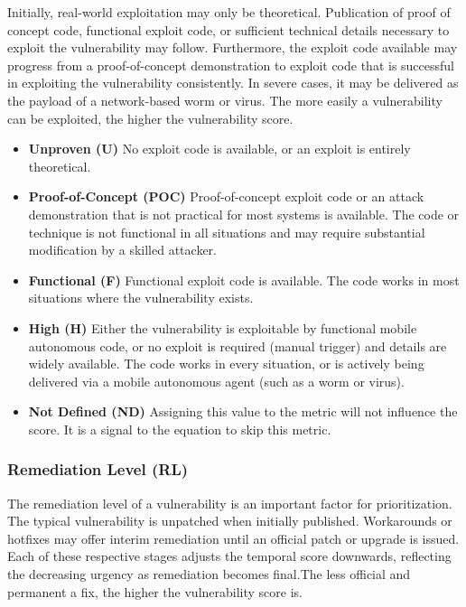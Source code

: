     Initially, real-world exploitation may only be theoretical. Publication
    of proof of concept code, functional exploit code, or sufficient
    technical details necessary to exploit the vulnerability may follow.
    Furthermore, the exploit code available may progress from a
    proof-of-concept demonstration to exploit code that is successful in
    exploiting the vulnerability consistently. In severe cases, it may be
    delivered as the payload of a network-based worm or virus. The more
    easily a vulnerability can be exploited, the higher the vulnerability
    score.

    \begin{itemize}
      \item
        \textbf{Unproven (U)} No exploit code is available, or an exploit is
        entirely theoretical.
      \item
        \textbf{Proof-of-Concept (POC)} Proof-of-concept exploit code or an
        attack demonstration that is not practical for most systems is
        available. The code or technique is not functional in all situations
        and may require substantial modification by a skilled attacker.
      \item
        \textbf{Functional (F)} Functional exploit code is available. The code
        works in most situations where the vulnerability exists.
      \item
        \textbf{High (H)} Either the vulnerability is exploitable by
        functional mobile autonomous code, or no exploit is required (manual
        trigger) and details are widely available. The code works in every
        situation, or is actively being delivered via a mobile autonomous
        agent (such as a worm or virus).
      \item
        \textbf{Not Defined (ND)} Assigning this value to the metric will not
        influence the score. It is a signal to the equation to skip this
        metric.
    \end{itemize}

    \subsubsection{Remediation Level (RL)}\label{subsec:remediation-level-rl}

    The remediation level of a vulnerability is an important factor for
    prioritization. The typical vulnerability is unpatched when initially
    published. Workarounds or hotfixes may offer interim remediation until
    an official patch or upgrade is issued. Each of these respective stages
    adjusts the temporal score downwards, reflecting the decreasing urgency
    as remediation becomes final.The less official and permanent a fix, the
    higher the vulnerability score is.

